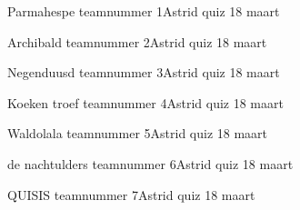 \documentclass{exam}
\begin{document}
\begin{landscape}

\vspace*{\fill}
\centering\LARGE{Parmahespe\linebreak
teamnummer 1\linebreak Astrid quiz 18 maart}
\vspace*{\fill}


\newpage

\vspace*{\fill}
\centering\LARGE{Archibald\linebreak
teamnummer 2\linebreak Astrid quiz 18 maart}
\vspace*{\fill}


\newpage

\vspace*{\fill}
\centering\LARGE{Negenduusd
\linebreak
teamnummer 3\linebreak Astrid quiz 18 maart}
\vspace*{\fill}


\newpage

\vspace*{\fill}
\centering\LARGE{Koeken troef
\linebreak
teamnummer 4\linebreak Astrid quiz 18 maart}
\vspace*{\fill}


\newpage

\vspace*{\fill}
\centering\LARGE{Waldolala\linebreak
teamnummer 5\linebreak Astrid quiz 18 maart}
\vspace*{\fill}


\newpage

\vspace*{\fill}
\centering\LARGE{de nachtulders\linebreak
teamnummer 6\linebreak Astrid quiz 18 maart}
\vspace*{\fill}


\newpage

\vspace*{\fill}
\centering\LARGE{QUISIS\linebreak
teamnummer 7\linebreak Astrid quiz 18 maart}
\vspace*{\fill}



\end{landscape}
\end{document}
